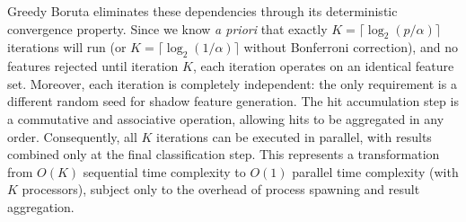 \documentclass[runningheads]{llncs}
\newcommand{\writeme}[1]{\todo[inline,color=yellow!40]{WRITE: #1}}
\begin{document}

Greedy Boruta eliminates these dependencies through its deterministic convergence property. Since we know \emph{a priori} that exactly $K = \lceil \log_2(p/\alpha) \rceil$ iterations will run (or $K = \lceil \log_2(1/\alpha) \rceil$ without Bonferroni correction), and no features rejected until iteration $K$, each iteration operates on an identical feature set. Moreover, each iteration is completely independent: the only requirement is a different random seed for shadow feature generation. The hit accumulation step is a commutative and associative operation, allowing hits to be aggregated in any order. Consequently, all $K$ iterations can be executed in parallel, with results combined only at the final classification step. This represents a transformation from $O(K)$ sequential time complexity to $O(1)$ parallel time complexity (with $K$ processors), subject only to the overhead of process spawning and result aggregation.

\end{document}
